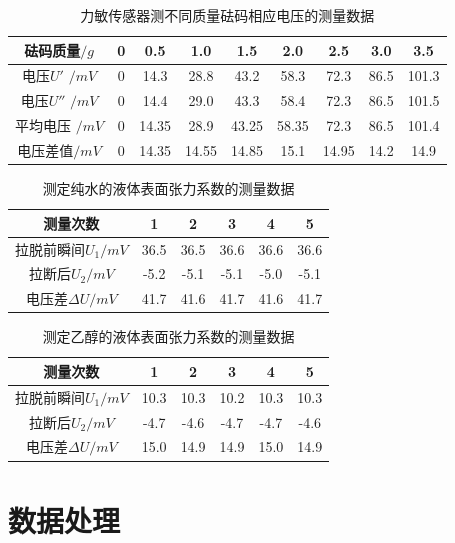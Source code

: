 \documentclass[UTF8]{ctexart}
\begin{document}
\begin{table}[H]
\centering
\caption{力敏传感器测不同质量砝码相应电压的测量数据}
\begin{tabular}{|c|c|c|c|c|c|c|c|c|}
\hline
     砝码质量$/g$ & 0 & 0.5 & 1.0 & 1.5 & 2.0 & 2.5 & 3.0 & 3.5 \\
\hline
     电压$U'$ $/mV $ & 0 & 14.3 & 28.8 & 43.2 & 58.3 & 72.3  &  86.5 & 101.3 \\ 
\hline
     电压$U''$ $/mV $ & 0 & 14.4 & 29.0 & 43.3 & 58.4 & 72.3  & 86.5  & 101.5\\
\hline
     平均电压 $/mV $ & 0 & 14.35 & 28.9 & 43.25 & 58.35 & 72.3 & 86.5  & 101.4 \\
\hline
     电压差值$/mV$  & 0 & 14.35 & 14.55 & 14.85 & 15.1 & 14.95  & 14.2  & 14.9\\ 
\hline

\end{tabular}
\end{table}

\begin{table}[H]
\centering
\caption{测定纯水的液体表面张力系数的测量数据}
\begin{tabular}{|c|c|c|c|c|c|}
\hline
     测量次数 & 1 & 2 & 3 & 4 & 5  \\
\hline
     拉脱前瞬间$U_1/mV$ & 36.5 & 36.5 & 36.6 & 36.6 & 36.6  \\ 
\hline
     拉断后$U_2/mV$  &  -5.2 & -5.1 & -5.1 & -5.0 & -5.1 \\
\hline
     电压差$\Delta U/mV$ & 41.7 & 41.6 & 41.7 & 41.6 & 41.7 \\
\hline

\end{tabular}
\end{table}

\begin{table}[H]
\centering
\caption{测定乙醇的液体表面张力系数的测量数据}
\begin{tabular}{|c|c|c|c|c|c|}
\hline
     测量次数 & 1 & 2 & 3 & 4 & 5  \\
\hline
     拉脱前瞬间$U_1/mV$ & 10.3 & 10.3 & 10.2 & 10.3 & 10.3  \\ 
\hline
     拉断后$U_2/mV$  &  -4.7 & -4.6 & -4.7 & -4.7 & -4.6\\
\hline
     电压差$\Delta U/mV$ & 15.0 & 14.9& 14.9 & 15.0 & 14.9 \\
\hline
\end{tabular}
\end{table}

\section{数据处理}
\end{document}
